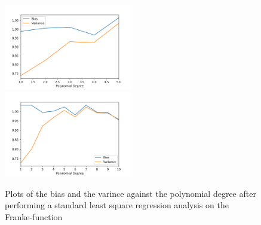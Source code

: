 \documentclass[a4paper,10pt,english]{article}
\begin{document}




\begin{figure}[H]
	\centering 
	\includegraphics[width = 0.5\textwidth, center]{../franke_output/part_C_1.png}
	\includegraphics[width = 0.5\textwidth, center]{../franke_output/part_C_1_highdeg.png}
	\caption{
		Plots of the bias and the varince against the polynomial degree after performing a standard least square regression analysis on the Franke-function
	}
	\label{part_c1}
\end{figure}
\end{document}

